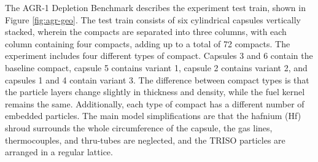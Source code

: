 The AGR-1 Depletion Benchmark \cite{sterbentz_agr1_2018} describes the experiment test train, shown in Figure \ref{fig:agr-geo}.
The test train consists of six cylindrical capsules vertically stacked, wherein the compacts are separated into three columns, with each column containing four compacts, adding up to a total of 72 compacts.
The experiment includes four different types of compact.
Capsules 3 and 6 contain the baseline compact, capsule 5 contains variant 1, capsule 2 contains variant 2, and capsules 1 and 4 contain variant 3.
The difference between compact types is that the particle layers change slightly in thickness and density, while the fuel kernel remains the same.
Additionally, each type of compact has a different number of embedded particles.
The main model simplifications are that the hafnium (Hf) shroud surrounds the whole circumference of the capsule, the gas lines, thermocouples, and thru-tubes are neglected, and the TRISO particles are arranged in a regular lattice.


